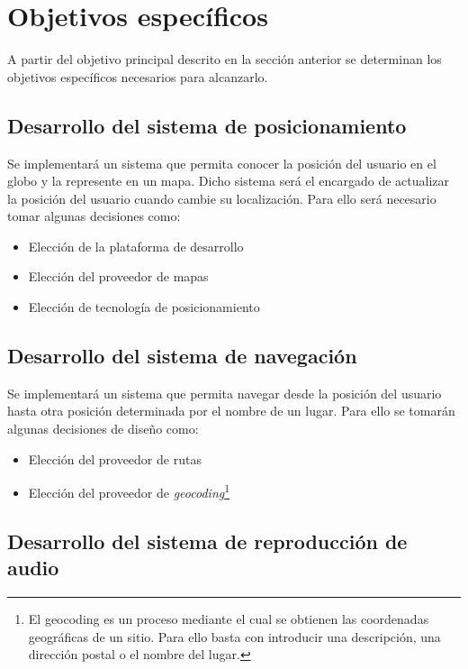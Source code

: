 \section{Objetivos específicos}

A partir del objetivo principal descrito en la sección anterior se determinan los objetivos
específicos necesarios para alcanzarlo.

\subsection{Desarrollo del sistema de posicionamiento}

Se implementará un sistema que permita conocer la posición del usuario en el globo y
la represente en un mapa. Dicho sistema será el encargado de actualizar la posición del usuario
cuando cambie su localización. Para ello será necesario tomar algunas decisiones como:

\begin{itemize}
  \item Elección de la plataforma de desarrollo
  \item Elección del proveedor de mapas
  \item Elección de tecnología de posicionamiento
\end{itemize}

\subsection{Desarrollo del sistema de navegación}

Se implementará un sistema que permita navegar desde la posición del usuario hasta otra posición
determinada por el nombre de un lugar. Para ello se tomarán algunas decisiones de diseño como:

\begin{itemize}
  \item Elección del proveedor de rutas
  \item Elección del proveedor de \emph{geocoding}\footnote{El geocoding es un proceso mediante el
    cual se obtienen las coordenadas geográficas de un sitio. Para ello basta con introducir una
    descripción, una dirección postal o el nombre del lugar.}
\end{itemize}

\subsection{Desarrollo del sistema de reproducción de audio}

